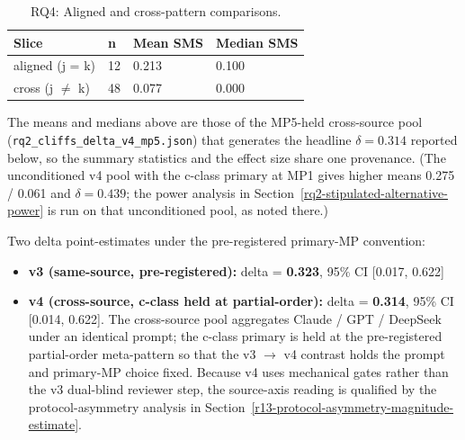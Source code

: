 \documentclass[manuscript,screen,review]{acmart}
\begin{document}
{%
\begin{longtable}[]{@{}llll@{}}
\caption{RQ4: Aligned and cross-pattern comparisons.}\label{tab:p2-09}\\
\toprule\noalign{}
Slice & n & Mean SMS & Median SMS \\
\midrule\noalign{}
\endhead
\bottomrule\noalign{}
\endlastfoot
aligned (j = k) & 12 & 0.213 & 0.100 \\
cross (j $\neq$ k) & 48 & 0.077 & 0.000 \\
\end{longtable}
}

The means and medians above are those of the MP5-held cross-source pool
(\texttt{rq2\_cliffs\_delta\_v4\_mp5.json}) that generates the headline
$\delta = 0.314$ reported below, so the summary statistics and the effect
size share one provenance. (The unconditioned v4 pool with the c-class
primary at MP1 gives higher means 0.275 / 0.061 and $\delta = 0.439$; the
power analysis in Section~\ref{rq2-stipulated-alternative-power} is run on
that unconditioned pool, as noted there.)

Two delta point-estimates under the pre-registered primary-MP
convention:

\begin{itemize}

\item
  \textbf{v3 (same-source, pre-registered):} delta = \textbf{0.323},
  95\% CI {[}0.017, 0.622{]}
\item
  \textbf{v4 (cross-source, c-class held at partial-order):} delta =
  \textbf{0.314}, 95\% CI {[}0.014, 0.622{]}. The cross-source pool
  aggregates Claude / GPT / DeepSeek under an identical prompt; the
  c-class primary is held at the pre-registered partial-order
  meta-pattern so that the v3 $\to$ v4
  contrast holds the prompt and primary-MP choice fixed. Because v4 uses
  mechanical gates rather than the v3 dual-blind reviewer step, the
  source-axis reading is qualified by the protocol-asymmetry analysis in
  Section~\ref{r13-protocol-asymmetry-magnitude-estimate}.
\end{itemize}
\end{document}
